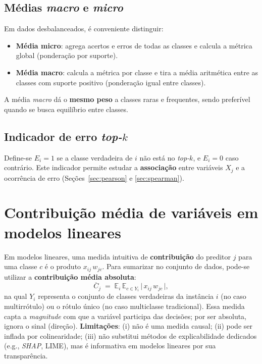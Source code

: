 \documentclass[12pt,a4paper]{article}
\begin{document}
\subsection{Médias \emph{macro} e \emph{micro}}
Em dados desbalanceados, é conveniente distinguir:
\begin{itemize}[leftmargin=1.2cm]
  \item \textbf{Média micro}: agrega acertos e erros de todas as classes e calcula a métrica global (ponderação por suporte).
  \item \textbf{Média macro}: calcula a métrica por classe e tira a média aritmética entre as classes com suporte positivo (ponderação igual entre classes).
\end{itemize}
A média \emph{macro} dá o \textbf{mesmo peso} a classes raras e frequentes, sendo preferível quando se busca equilíbrio entre classes.

\subsection{Indicador de erro \emph{top-$k$}}
Define-se $E_i=1$ se a classe verdadeira de $i$ não está no \emph{top-$k$}, e $E_i=0$ caso contrário. Este indicador permite estudar a \textbf{associação} entre variáveis $X_j$ e a ocorrência de erro (Seções~\ref{sec:pearson} e \ref{sec:spearman}).

\section{Contribuição média de variáveis em modelos lineares}
Em modelos lineares, uma medida intuitiva de \textbf{contribuição} do preditor $j$ para uma classe $c$ é o produto $x_{ij}\,w_{jc}$. Para sumarizar no conjunto de dados, pode-se utilizar a \textbf{contribuição média absoluta}:
\begin{equation}
\overline{C}_j \;=\; \mathbb{E}_i\,\mathbb{E}_{c \in Y_i}\,\bigl|\,x_{ij}\,w_{jc}\,\bigr|,
\end{equation}
na qual $Y_i$ representa o conjunto de classes verdadeiras da instância $i$ (no caso multirrótulo) ou o rótulo único (no caso multiclasse tradicional). Essa medida capta a \emph{magnitude} com que a variável participa das decisões; por ser absoluta, ignora o sinal (direção). \textbf{Limitações}: (i) não é uma medida causal; (ii) pode ser inflada por colinearidade; (iii) não substitui métodos de explicabilidade dedicados (e.g., \emph{SHAP}, LIME), mas é informativa em modelos lineares por sua transparência.
\end{document}

